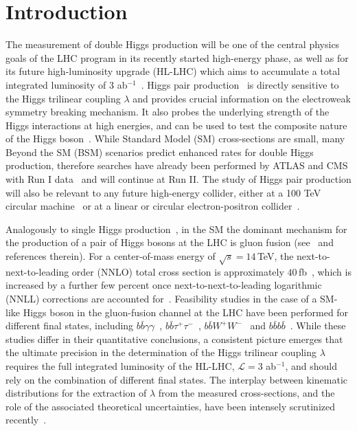 \section{Introduction}

The measurement of double Higgs production will be one of the central
physics goals of the LHC program in its recently started high-energy
phase, as well as for its future high-luminosity upgrade (HL-LHC)
which aims to accumulate a total integrated
luminosity of 3 ab$^{-1}$~\cite{ATLAS:2013hta,CMS:2013xfa}.
%
Higgs pair production~\cite{baglio} is directly sensitive to the
Higgs trilinear coupling $\lambda$ and 
provides crucial
information on the electroweak symmetry breaking mechanism.
%
It also probes the underlying strength of the Higgs interactions
at high energies, and can be used to test the composite nature of the 
Higgs boson~\cite{Giudice:2007fh,Contino:2010mh}.
%
While Standard Model (SM) cross-sections are small,
many Beyond the SM (BSM)
scenarios predict enhanced rates for double Higgs production, therefore searches have already been performed by ATLAS and CMS with Run I data~\cite{Aad:2015xja,Aad:2015uka,Aad:2014yja,Khachatryan:2015yea,Chatrchyan:2011wt}
and will continue at Run II.
%
The study of Higgs pair production will also be relevant to
any future high-energy 
collider, either at a 100 TeV circular machine~\cite{Arkani-Hamed:2015vfh,Barr:2014sga,Papaefstathiou:2015iba,Azatov:2015oxa} or at
a linear or circular electron-positron collider~\cite{Contino:2013gna}.

Analogously to single Higgs production~\cite{Dittmaier:2012vm}, 
in the SM the dominant mechanism for the production of a pair of
Higgs bosons at the LHC is 
gluon fusion (see~\cite{baglio,Frederix:2014hta} and
references therein).
%
For a center-of-mass energy of $\sqrt{s} = 14\,$TeV, the
next-to-next-to-leading order (NNLO)
total cross section is approximately $40\,$fb~\cite{deFlorian:2013jea},
which is increased by a further few percent once
next-to-next-to-leading logarithmic
(NNLL) corrections
are accounted for~\cite{deFlorian:2015moa}.
%
Feasibility studies in the case of a SM-like Higgs boson
in the gluon-fusion channel
at the LHC have been performed for different final states, including
$b\bar b\gamma\gamma$~\cite{Baur:2003gp,Barger:2013jfa,Lu:2015jza},
$b\bar{b}\tau^+\tau^-$~\cite{Baur:2003gpa,Barr:2013tda,Dolan:2012rv,Dolan:2013rja},
$b\bar{b}W^+W^-$~\cite{Dolan:2012rv,Papaefstathiou:2012qe} and
$b\bar{b}b\bar{b}$~\cite{Baur:2003gpa,Dolan:2012rv,Wardrope:2014kya,deLima:2014dta,Barger:2013jfa}.
%
While these studies differ in their quantitative conclusions,
a consistent picture emerges 
that the ultimate precision in the determination of the Higgs trilinear
coupling $\lambda$ requires the full integrated luminosity
of the HL-LHC, $\mathcal{L}=3$ ab$^{-1}$,
and should rely on the combination of different final states.
%
The interplay between  kinematic
distributions for the
extraction of $\lambda$ from the measured
cross-sections, and the role of the associated theoretical
uncertainties, have been intensely scrutinized
recently~\cite{Slawinska:2014vpa,Chen:2014xra,Goertz:2013kp,
  Frederix:2014hta,Dawson:2015oha,Maltoni:2014eza,Maierhofer:2013sha,Grigo:2013rya,Grigo:2014jma}.
%

